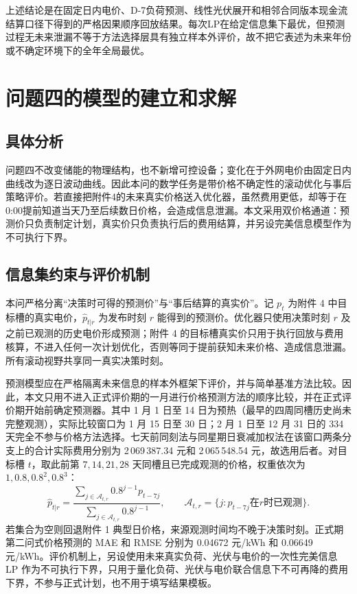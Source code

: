 \documentclass[withoutpreface,bwprint]{cumcmthesis}
\begin{document}
上述结论是在固定日内电价、D-7负荷预测、线性光伏展开和相邻合同版本现金流结算口径下得到的严格因果顺序回放结果。每次LP在给定信息集下最优，但预测过程无未来泄漏不等于方法选择层具有独立样本外评价，故不把它表述为未来年份或不确定环境下的全年全局最优。
















\section{问题四的模型的建立和求解}
\subsection{具体分析}

问题四不改变储能的物理结构，也不新增可控设备；变化在于外网电价由固定日内曲线改为逐日波动曲线。因此本问的数学任务是带价格不确定性的滚动优化与事后策略评价。若直接把附件4的未来真实价格送入优化器，虽然费用更低，却等于在0:00提前知道当天乃至后续数日价格，会造成信息泄漏。本文采用双价格通道：预测价只负责制定计划，真实价只负责执行后的费用结算，并另设完美信息模型作为不可执行下界。

\subsection{信息集约束与评价机制}

本问严格分离“决策时可得的预测价”与“事后结算的真实价”。记 $p_t$ 为附件 4 中目标槽的真实电价，$\hat p_{t|r}$ 为发布时刻 $r$ 能得到的预测价。优化器只使用决策时刻 $r$ 及之前已观测的历史电价形成预测；附件 4 的目标槽真实价只用于执行回放与费用核算，不进入任何一次计划优化，否则等同于提前获知未来价格、造成信息泄漏。所有滚动视野共享同一真实决策时刻。

预测模型应在严格隔离未来信息的样本外框架下评价，并与简单基准方法比较\cite{tashman2000outsample}。因此，本文只用不进入正式评价期的一月进行价格预测方法的顺序比较，并在正式评价期开始前确定预测器。其中 1 月 1 日至 14 日为预热（最早的四周同槽历史尚未完整观测），实际比较窗口为 1 月 15 日至 30 日；2 月 1 日至 12 月 31 日的 334 天完全不参与价格方法选择。七天前同刻法与同星期日衰减加权法在该窗口两条分支上的合计实际费用分别为 2\,069\,387.34 元和 2\,065\,548.54 元，故选用后者。对目标槽 $t$，取此前第 $7,14,21,28$ 天同槽且已完成观测的价格，权重依次为 $1,0.8,0.8^2,0.8^3$：
\begin{equation}
\hat p_{t|r}=\frac{\sum_{j\in\mathcal A_{t,r}}0.8^{j-1}p_{t-7j}}
{\sum_{j\in\mathcal A_{t,r}}0.8^{j-1}},\qquad
\mathcal A_{t,r}=\{j:p_{t-7j}\text{在}r\text{时已观测}\}.
\end{equation}
若集合为空则回退附件 1 典型日价格，来源观测时间均不晚于决策时刻。正式期第二问式价格预测的 MAE 和 RMSE 分别为 0.04672 元/kWh 和 0.06649 元/kWh。评价机制上，另设使用未来真实负荷、光伏与电价的一次性完美信息 LP 作为不可执行下界，只用于量化负荷、光伏与电价联合信息下不可再降的费用下界，不参与正式计划，也不用于填写结果模板。
\end{document}
